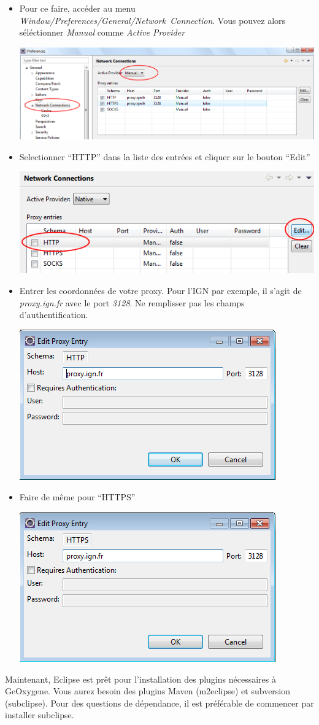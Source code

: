 \begin{itemize}[leftmargin=* ,parsep=0cm,itemsep=0cm,topsep=0cm]

\item Pour ce faire, accéder au menu \emph{Window/Preferences/General/Network~Connection}. Vous pouvez alors séléctionner \emph{Manual} comme \emph{Active Provider} 

\begin{center}
\includegraphics[width=0.8\linewidth]{../../resources/images/guide_installation/proxy3.png}
\end{center}

\item Selectionner “HTTP” dans la liste des entrées et cliquer sur le bouton “Edit”

\begin{center}
\includegraphics[width=0.5\linewidth]{../../resources/images/guide_installation/proxy4.png}
\end{center}


\item Entrer les coordonnées de votre proxy. Pour l'IGN par exemple, il s'agit de \emph{proxy.ign.fr} avec le port \emph{3128}. Ne remplisser pas les champs d'authentification.

\begin{center}
\includegraphics[width=0.4\linewidth]{../../resources/images/guide_installation/proxy1.png}
\end{center}


\item Faire de même pour “HTTPS”

\begin{center}
\includegraphics[width=0.4\linewidth]{../../resources/images/guide_installation/proxy2.png}
\end{center}


\end{itemize}

\noindent
Maintenant, Eclipse est prêt pour l'installation des plugins nécessaires à GeOxygene. Vous aurez besoin des plugins Maven (m2eclipse) et subversion (subclipse). Pour des questions de d\'ependance, il est pr\'ef\'erable de commencer par installer subclipse.

